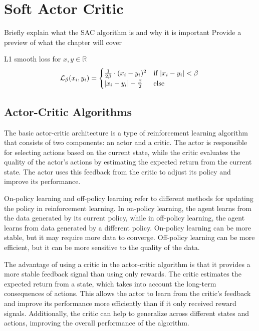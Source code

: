\section{Soft Actor Critic}
Briefly explain what the SAC algorithm is and why it is important
Provide a preview of what the chapter will cover

L1 smooth loss for $x, y \in \mathbb{R}$
\begin{equation}
    \mathcal{L}_\beta(x_i, y_i) = \begin{cases} \frac{1}{2 \beta} \cdot (x_i - y_i)^2 & \text{if $|x_i - y_i| < \beta$} \\ |x_i - y_i| -  \frac{\beta}{2} & \text{else}\end{cases} \\ 
\end{equation}

\subsection{Actor-Critic Algorithms}

The basic actor-critic architecture is a type of reinforcement learning algorithm that consists of two components: an actor and a critic. The actor is responsible for selecting actions based on the current state, while the critic evaluates the quality of the actor's actions by estimating the expected return from the current state. The actor uses this feedback from the critic to adjust its policy and improve its performance.

On-policy learning and off-policy learning refer to different methods for updating the policy in reinforcement learning. In on-policy learning, the agent learns from the data generated by its current policy, while in off-policy learning, the agent learns from data generated by a different policy. On-policy learning can be more stable, but it may require more data to converge. Off-policy learning can be more efficient, but it can be more sensitive to the quality of the data.

The advantage of using a critic in the actor-critic algorithm is that it provides a more stable feedback signal than using only rewards. The critic estimates the expected return from a state, which takes into account the long-term consequences of actions. This allows the actor to learn from the critic's feedback and improve its performance more efficiently than if it only received reward signals. Additionally, the critic can help to generalize across different states and actions, improving the overall performance of the algorithm.

